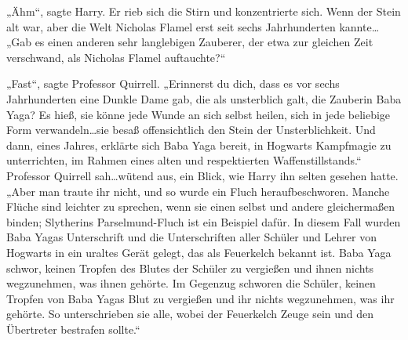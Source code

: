 „Ähm“, sagte Harry.
Er rieb sich die Stirn und konzentrierte sich.
Wenn der Stein alt war, aber die Welt Nicholas Flamel erst seit sechs Jahrhunderten kannte…
„Gab es einen anderen sehr langlebigen Zauberer, der etwa zur gleichen Zeit verschwand, als Nicholas Flamel auftauchte?“

„Fast“, sagte Professor Quirrell.
„Erinnerst du dich, dass es vor sechs Jahrhunderten eine Dunkle Dame gab, die als unsterblich galt, die Zauberin Baba Yaga? Es hieß, sie könne jede Wunde an sich selbst heilen, sich in jede beliebige Form verwandeln…sie besaß offensichtlich den Stein der Unsterblichkeit. Und dann, eines Jahres, erklärte sich Baba Yaga bereit, in Hogwarts Kampfmagie zu unterrichten, im Rahmen eines alten und respektierten Waffenstillstands.“
Professor Quirrell sah…wütend aus, ein Blick, wie Harry ihn selten gesehen hatte.
„Aber man traute ihr nicht, und so wurde ein Fluch heraufbeschworen. Manche Flüche sind leichter zu sprechen, wenn sie einen selbst und andere gleichermaßen binden; Slytherins Parselmund-Fluch ist ein Beispiel dafür. In diesem Fall wurden Baba Yagas Unterschrift und die Unterschriften aller Schüler und Lehrer von Hogwarts in ein uraltes Gerät gelegt, das als Feuerkelch bekannt ist. Baba Yaga schwor, keinen Tropfen des Blutes der Schüler zu vergießen und ihnen nichts wegzunehmen, was ihnen gehörte. Im Gegenzug schworen die Schüler, keinen Tropfen von Baba Yagas Blut zu vergießen und ihr nichts wegzunehmen, was ihr gehörte. So unterschrieben sie alle, wobei der Feuerkelch Zeuge sein und den Übertreter bestrafen sollte.“

